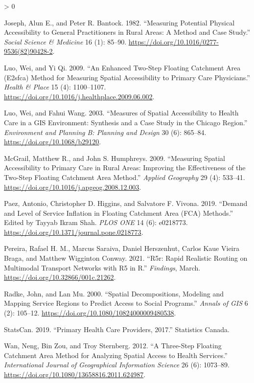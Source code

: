 \documentclass{article}
\newlength{\cslhangindent}
\newenvironment{CSLReferences}[2] %
 {%
  \setlength{\parindent}{0pt}
  \ifodd #1 \everypar{\setlength{\hangindent}{\cslhangindent}}\ignorespaces\fi
  \ifnum #2 > 0
  \setlength{\parskip}{#2\baselineskip}
  \fi
 }%
 {}
\begin{document}
\begin{CSLReferences}{1}{0}
\leavevmode\hypertarget{ref-joseph1982}{}%
Joseph, Alun E., and Peter R. Bantock. 1982. {``Measuring Potential
Physical Accessibility to General Practitioners in Rural Areas: A Method
and Case Study.''} \emph{Social Science \& Medicine} 16 (1): 85--90.
\url{https://doi.org/10.1016/0277-9536(82)90428-2}.

\leavevmode\hypertarget{ref-luo2009}{}%
Luo, Wei, and Yi Qi. 2009. {``An Enhanced Two-Step Floating Catchment
Area (E2sfca) Method for Measuring Spatial Accessibility to Primary Care
Physicians.''} \emph{Health \& Place} 15 (4): 1100--1107.
\url{https://doi.org/10.1016/j.healthplace.2009.06.002}.

\leavevmode\hypertarget{ref-luo2003}{}%
Luo, Wei, and Fahui Wang. 2003. {``Measures of Spatial Accessibility to
Health Care in a GIS Environment: Synthesis and a Case Study in the
Chicago Region.''} \emph{Environment and Planning B: Planning and
Design} 30 (6): 865--84. \url{https://doi.org/10.1068/b29120}.

\leavevmode\hypertarget{ref-mcgrail2009}{}%
McGrail, Matthew R., and John S. Humphreys. 2009. {``Measuring Spatial
Accessibility to Primary Care in Rural Areas: Improving the
Effectiveness of the Two-Step Floating Catchment Area Method.''}
\emph{Applied Geography} 29 (4): 533--41.
\url{https://doi.org/10.1016/j.apgeog.2008.12.003}.

\leavevmode\hypertarget{ref-paez2019}{}%
Paez, Antonio, Christopher D. Higgins, and Salvatore F. Vivona. 2019.
{``Demand and Level of Service Inflation in Floating Catchment Area
(FCA) Methods.''} Edited by Tayyab Ikram Shah. \emph{PLOS ONE} 14 (6):
e0218773. \url{https://doi.org/10.1371/journal.pone.0218773}.

\leavevmode\hypertarget{ref-pereira2021}{}%
Pereira, Rafael H. M., Marcus Saraiva, Daniel Herszenhut, Carlos Kaue
Vieira Braga, and Matthew Wigginton Conway. 2021. {``R5r: Rapid
Realistic Routing on Multimodal Transport Networks with R5 in R.''}
\emph{Findings}, March. \url{https://doi.org/10.32866/001c.21262}.

\leavevmode\hypertarget{ref-radke2000}{}%
Radke, John, and Lan Mu. 2000. {``Spatial Decompositions, Modeling and
Mapping Service Regions to Predict Access to Social Programs.''}
\emph{Annals of GIS} 6 (2): 105--12.
\url{https://doi.org/10.1080/10824000009480538}.

\leavevmode\hypertarget{ref-statcan2019}{}%
StatsCan. 2019. {``Primary Health Care Providers, 2017.''} Statistics
Canada.

\leavevmode\hypertarget{ref-wan2012}{}%
Wan, Neng, Bin Zou, and Troy Sternberg. 2012. {``A Three-Step Floating
Catchment Area Method for Analyzing Spatial Access to Health
Services.''} \emph{International Journal of Geographical Information
Science} 26 (6): 1073--89.
\url{https://doi.org/10.1080/13658816.2011.624987}.

\end{CSLReferences}



\end{document}

